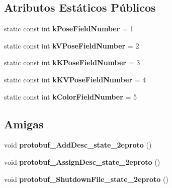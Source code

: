 \subsection*{Atributos Estáticos Públicos}
\begin{DoxyCompactItemize}
\item 
static const int {\bfseries k\+Pose\+Field\+Number} = 1\hypertarget{classvss__state_1_1Robot__State_a06e3140dd78f55d44314911855a3fe81}{}\label{classvss__state_1_1Robot__State_a06e3140dd78f55d44314911855a3fe81}

\item 
static const int {\bfseries k\+V\+Pose\+Field\+Number} = 2\hypertarget{classvss__state_1_1Robot__State_aa6dfdfba7f7196572fc98034331e6909}{}\label{classvss__state_1_1Robot__State_aa6dfdfba7f7196572fc98034331e6909}

\item 
static const int {\bfseries k\+K\+Pose\+Field\+Number} = 3\hypertarget{classvss__state_1_1Robot__State_ae9b978f27b1c1b69a48d75ebf32ef4f4}{}\label{classvss__state_1_1Robot__State_ae9b978f27b1c1b69a48d75ebf32ef4f4}

\item 
static const int {\bfseries k\+K\+V\+Pose\+Field\+Number} = 4\hypertarget{classvss__state_1_1Robot__State_abc59194083bbc5b0aed20ad2516828bb}{}\label{classvss__state_1_1Robot__State_abc59194083bbc5b0aed20ad2516828bb}

\item 
static const int {\bfseries k\+Color\+Field\+Number} = 5\hypertarget{classvss__state_1_1Robot__State_a941074e9004ce28bc7cddfd36aeacb43}{}\label{classvss__state_1_1Robot__State_a941074e9004ce28bc7cddfd36aeacb43}

\end{DoxyCompactItemize}
\subsection*{Amigas}
\begin{DoxyCompactItemize}
\item 
void {\bfseries protobuf\+\_\+\+Add\+Desc\+\_\+state\+\_\+2eproto} ()\hypertarget{classvss__state_1_1Robot__State_aab1a2c258f8122a403a979ff57e2a706}{}\label{classvss__state_1_1Robot__State_aab1a2c258f8122a403a979ff57e2a706}

\item 
void {\bfseries protobuf\+\_\+\+Assign\+Desc\+\_\+state\+\_\+2eproto} ()\hypertarget{classvss__state_1_1Robot__State_a57d9367bc8a7a94ead11d11194cca1b6}{}\label{classvss__state_1_1Robot__State_a57d9367bc8a7a94ead11d11194cca1b6}

\item 
void {\bfseries protobuf\+\_\+\+Shutdown\+File\+\_\+state\+\_\+2eproto} ()\hypertarget{classvss__state_1_1Robot__State_a4e6dc5e8e72799859c4e9556d090e57d}{}\label{classvss__state_1_1Robot__State_a4e6dc5e8e72799859c4e9556d090e57d}

\end{DoxyCompactItemize}


